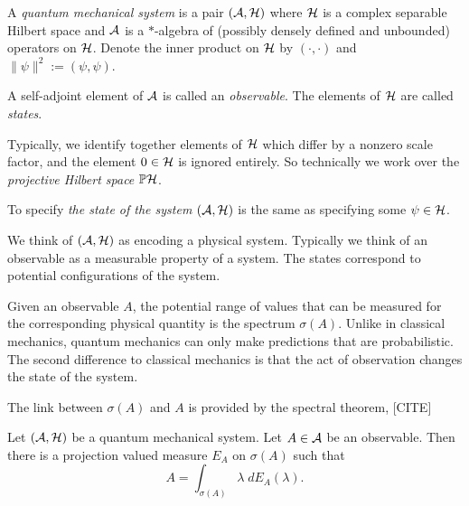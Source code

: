 \begin{definition}
    A \emph{quantum mechanical system} is a pair $(\mathcal{A},\mathcal{H})$ where $\mathcal{H}$
    is a complex separable Hilbert space and $\mathcal{A}$ is a $*$-algebra
    of (possibly densely defined and unbounded) operators on $\mathcal{H}$. 
    Denote the inner product on $\mathcal{H}$ by $(\cdot,\cdot)$
    and $\|\psi\|^2 := (\psi,\psi)$.
    
    
    A self-adjoint element of $\mathcal{A}$ is called an \emph{observable}. 
    The elements of $\mathcal{H}$ are called \emph{states}. 
    
    Typically, we identify together elements of $\mathcal{H}$
    which differ by a nonzero scale factor, and the element $0 \in \mathcal{H}$
    is ignored entirely. So technically we work over the \emph{projective
    Hilbert space} $\mathbb{P}\mathcal{H}$.
    
    To specify \emph{the state of the system} $(\mathcal{A},\mathcal{H})$ is the same
    as specifying some $\psi \in \mathcal{H}$.
\end{definition}

We think of $(\mathcal{A},\mathcal{H})$ as encoding a physical system. 
Typically we think of an observable as a measurable
property of a system. The states correspond to potential
configurations of the system.

Given an observable $A$, the potential range
of values that can be measured
for the corresponding physical quantity is the spectrum $\sigma(A)$. Unlike in classical mechanics,
quantum mechanics can only make predictions that are probabilistic.
The second difference to classical mechanics is that the act of observation changes
the state of the system.

The link
between $\sigma(A)$ and $A$ is provided by the spectral theorem, [CITE]
\begin{theorem}
    Let $(\mathcal{A},\mathcal{H})$ be a quantum mechanical system. Let $A \in \mathcal{A}$ be an observable.
    Then there is a projection valued measure $E_A$ on $\sigma(A)$ such that
    \begin{equation*}
        A = \int_{\sigma(A)} \lambda\;dE_A(\lambda).
    \end{equation*}
\end{theorem}

